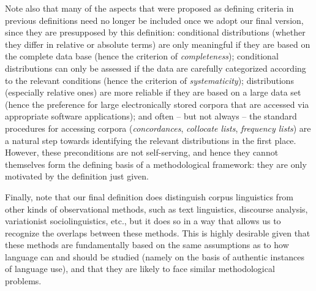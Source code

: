 Note also that many of the aspects that were proposed as defining criteria in previous definitions need no longer be included once we adopt our final version, since they are presupposed by this definition: conditional distributions  (whether they differ in relative or absolute terms) are only meaningful if they are based on the complete data base (hence the criterion of \emph{completeness}); conditional distributions  can only be assessed if the data are carefully categorized  according to the relevant conditions (hence the criterion of \emph{systematicity}); distributions (especially relative ones) are more reliable  if they are based on a large  data set (hence the preference for large electronically stored corpora that are accessed via appropriate software applications); and often -- but not always -- the standard procedures for accessing corpora (\emph{concordances},  \emph{collocate lists},  \emph{frequency lists})  are a natural step towards identifying the relevant distributions in the first place. However, these preconditions are not self\hyp{}serving, and hence they cannot themselves form the defining basis of a methodological framework: they are only motivated by the definition just given.\largerpage

Finally, note that our final definition does distinguish corpus linguistics from other kinds of observational  methods, such as text linguistics, discourse analysis, variationist sociolinguistics,  etc., but it does so in a way that allows us to recognize the overlaps between these methods. This is highly desirable given that these methods are fundamentally based on the same assumptions as to how language can and should be studied (namely on the basis of authentic  instances of language use), and that they are likely to face similar methodological problems.


